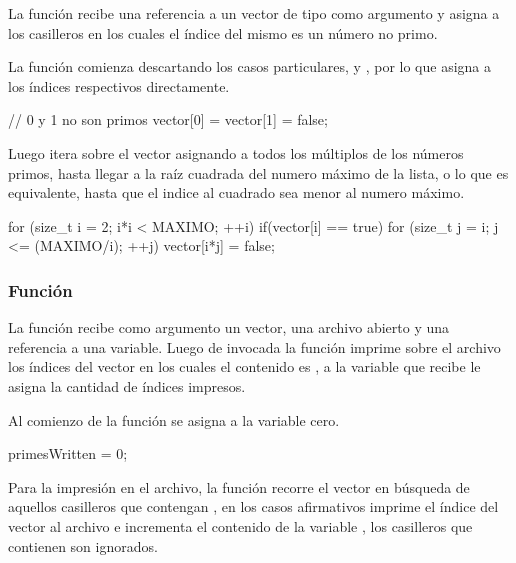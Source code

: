 \documentclass[12pt]{article}
\newenvironment{fullgrayverb}
{\verbbox}
{\endverbbox\par\colorbox{gray!25}{\parbox{\textwidth}{\theverbbox}}\par}
\begin{document}
La función  recibe una referencia a un vector de
tipo  como argumento y asigna  a los casilleros en los
cuales el índice del mismo es un número no primo. 

La función comienza descartando los casos particulares,  y , por
lo que asigna  a los índices respectivos directamente.

\begin{fullgrayverb}[\mbox{}]
// 0 y 1 no son primos
vector[0] = vector[1] = false;
\end{fullgrayverb}

Luego itera sobre el vector asignando  a todos los múltiplos de los
números primos, hasta llegar a la raíz cuadrada del numero máximo de la lista, o
lo que es equivalente, hasta que el indice al cuadrado sea menor al numero
máximo.

\begin{fullgrayverb}[\mbox{}]
for (size_t i = 2; i*i < MAXIMO; ++i) {
    if(vector[i] == true) {
        for (size_t j = i; j <= (MAXIMO/i); ++j) {
            vector[i*j] = false;
        }
    }
}
\end{fullgrayverb}

\subsubsection{Función }

La función  recibe como argumento un vector, una
archivo abierto y una referencia a una variable. Luego de invocada la función
imprime sobre el archivo los índices del vector en los cuales el contenido es
, a la variable que recibe le asigna la cantidad de índices impresos.

Al comienzo de la función se asigna a la variable  cero.

\begin{fullgrayverb}[\mbox{}]
primesWritten = 0;
\end{fullgrayverb}

Para la impresión en el archivo, la función recorre el vector en búsqueda de
aquellos casilleros que contengan , en los casos afirmativos imprime
el índice del vector al archivo e incrementa el contenido de la variable
, los casilleros que contienen  son ignorados.
\end{document}

